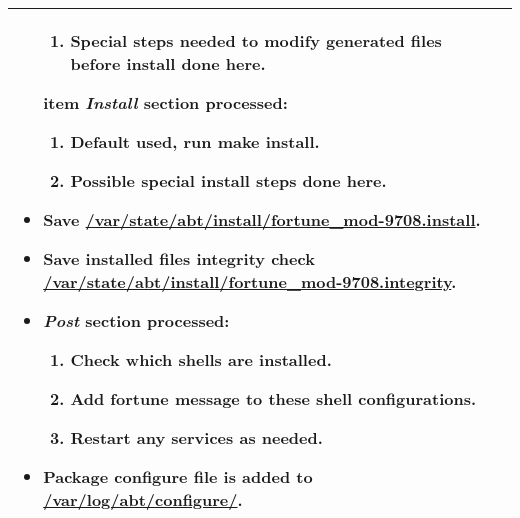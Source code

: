 \begin{tabularx}{\linewidth}{|l|X|}
\begin{minipage}{\linewidth}
\begin{itemize}
\begin{enumerate}
      \item Special steps needed to modify generated files before install done here.
    \end{enumerate}
    item \emph{Install} section processed:
    \begin{enumerate}
      \item Default used, run \textbf{make install}.
      \item Possible special install steps done here.
    \end{enumerate}
    \item Save \url{/var/state/abt/install/fortune_mod-9708.install}.
    \item Save installed files integrity check \url{/var/state/abt/install/fortune_mod-9708.integrity}.
    \item \emph{Post} section processed:
    \begin{enumerate}
      \item Check which shells are installed.
      \item Add fortune message to these shell configurations.
      \item Restart any services as needed.
    \end{enumerate}
    \item Package configure file is added to \url{/var/log/abt/configure/}.
  \end{itemize}
  \vspace{0.05em}
\end{minipage}
\\
\hline 
\end{tabularx}



